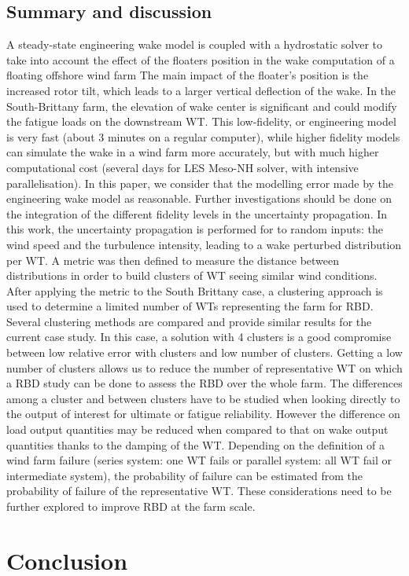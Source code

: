 \subsection{Summary and discussion}
A steady-state engineering wake model is coupled with a hydrostatic solver to take into account the effect of the floaters position in the wake computation of a floating offshore wind farm
The main impact of the floater's position is the increased rotor tilt, which leads to a larger vertical deflection of the wake. 
In the South-Brittany farm, the elevation of wake center is significant and could modify the fatigue loads on the downstream WT. 
This low-fidelity, or engineering model is very fast (about 3 minutes on a regular computer), while higher fidelity models can simulate the wake in a wind farm more accurately, but with much higher computational cost (several days for LES Meso-NH solver, with intensive parallelisation). 
In this paper, we consider that the modelling error made by the engineering wake model as reasonable. 
Further investigations should be done on the integration of the different fidelity levels in the uncertainty propagation. 
In this work, the uncertainty propagation is performed for to random inputs: the wind speed and the turbulence intensity, leading to a wake perturbed distribution per WT. 
A metric was then defined to measure the distance between distributions in order to build clusters of WT seeing similar wind conditions. 
After applying the metric to the South Brittany case, a clustering approach is used to determine a limited number of WTs representing the farm for RBD. 
Several clustering methods are compared and provide similar results for the current case study. In this case, a solution with 4 clusters is a good compromise between low relative error with clusters and low number of clusters. 
Getting a low number of clusters allows us to reduce the number of representative WT on which a RBD study can be done to assess the RBD over the whole farm. 
The differences among a cluster and between clusters have to be studied when looking directly to the output of interest for ultimate or fatigue reliability. 
However the difference on load output quantities may be reduced when compared to that on wake output quantities thanks to the damping of the WT. 
Depending on the definition of a wind farm failure (series system: one WT fails or parallel system: all WT fail or intermediate system), the probability of failure can be estimated from the probability of failure of the representative WT. 
These considerations need to be further explored to improve RBD at the farm scale. 


\section{Conclusion}
